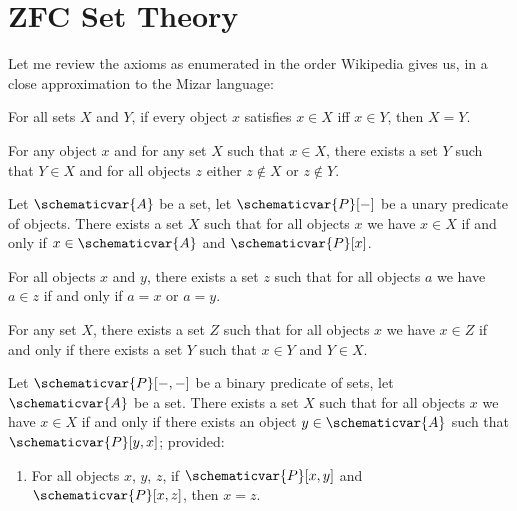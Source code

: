 \section{ZFC Set Theory}
\begin{node}[Axioms]\label{set:zfc-0000}%
Let me review the axioms as enumerated in the order Wikipedia gives us,
in a close approximation to the Mizar language:

\begin{node}[Extentionality]\label{set:zfc-0001}%
For all sets $X$ and $Y$, if every object $x$ satisfies $x\in X$ iff
$x\in Y$, then $X=Y$.
\end{node}

\begin{node}[Regularity]\label{set:zfc-0004}%
For any object $x$ and for any set $X$ such that $x\in X$,
there exists a set $Y$ such that $Y\in X$ and for all objects $z$ either
$z\notin X$ or $z\notin Y$.
\end{node}

\begin{node}\label{set:zfc-0005}%
Let $\schematicvar{A}$ be a set, let $\schematicvar{P}[-]$ be a unary predicate of
objects. There exists a set $X$ such that for all objects $x$ we have
$x\in X$ if and only if $x\in\schematicvar{A}$ and $\schematicvar{P}[x]$.
\end{node}

\begin{node}[Pairing]\label{set:zfc-0002}%
For all objects $x$ and $y$, there exists a set $z$ such that for all
objects $a$ we have $a\in z$ if and only if $a=x$ or $a=y$.
\end{node}

\begin{node}[Union]\label{set:zfc-0003}%
For any set $X$, there exists a set $Z$ such that for all objects $x$ we
have $x\in Z$ if and only if there exists a set $Y$ such that $x\in Y$
and $Y\in X$.
\end{node}

\begin{node}\label{set:zfc-0006}%
Let $\schematicvar{P}[-,-]$ be a binary predicate of sets, let $\schematicvar{A}$
be a set. There exists a set $X$ such that for all objects $x$ we have
$x\in X$ if and only if there exists an object $y\in\schematicvar{A}$ such
that $\schematicvar{P}[y,x]$; provided:
\begin{enumerate}
\item For all objects $x$, $y$, $z$, if $\schematicvar{P}[x,y]$ and
  $\schematicvar{P}[x,z]$, then $x=z$.
\end{enumerate}
\end{node}


\end{node}
